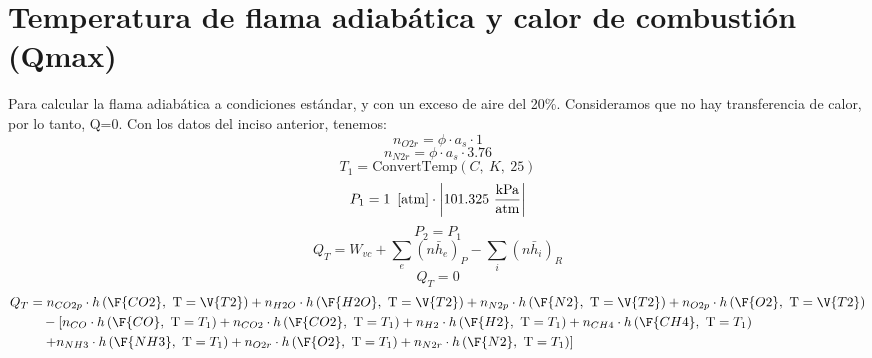 \documentclass{article}
\theoremstyle{mytheoremstyle}
\theoremstyle{mytheoremstyle}
\theoremstyle{myproblemstyle}
\begin{document}
\section{Temperatura de flama adiabática y calor de combustión (Qmax)}
Para calcular la flama adiabática a condiciones estándar, y con un exceso de aire del 20\%. Consideramos que no hay transferencia de calor, por lo tanto, Q=0.
Con los datos del inciso anterior, tenemos:
\begin{equation}
    \label{EES Eqn:28}
    n_{O2r} = \phi\cdot a_{s}\cdot 1 
    \end{equation}
    \begin{equation}
    \label{EES Eqn:29}
    n_{N2r} = \phi\cdot a_{s}\cdot 3.76 
    \end{equation}
    \begin{equation}
    \label{EES Eqn:30}
    T_{1} = \mbox{ConvertTemp}{ \left( C,\ K,\ 25 \right) } 
    \end{equation}
    \begin{equation}
    \label{EES Eqn:31}
    P_{1} = 1   \   \left[ \rm atm \right] \cdot  \rm { \left|101.325\ \frac {\rm{kPa}}{\rm{atm}}\right|} 
    \end{equation}
    {\color{blue} \rm}
    \begin{equation}
    \label{EES Eqn:32}
    P_{2} = P_{1} 
    \end{equation}
    \begin{equation}
    \label{EES Eqn:33}
    Q_{T} = W_{vc} + \sum_{e} (n \bar{h}_e)_P - \sum_{i} (n \bar{h}_i)_R
    \end{equation}
    \begin{equation}
        \label{EES Eqn:33}
        Q_{T} = 0 
        \end{equation}
    \begin{equation}
    \label{EES Eqn:34}
    \begin{align}
        Q_{T} &= n_{CO2p}\cdot h \left(\F{CO2},\mbox{\ T}=\V{T2}  \right)  + n_{H2O}\cdot h \left(\F{H2O},\mbox{\ T}=\V{T2}  \right)  + n_{N2p}\cdot h \left(\F{N2},\mbox{\ T}=\V{T2}  \right)  +  n_{O2p}\cdot h \left(\F{O2},\mbox{\ T}=\V{T2}  \right) \nonumber \\
        &\quad -  \left[ n_{CO}\cdot h \left(\F{CO},\mbox{\ T}=T_{1} \right)  + n_{CO2}\cdot h \left(\F{CO2},\mbox{\ T}=T_{1} \right)  + n_{H2}\cdot h \left(\F{H2},\mbox{\ T}=T_{1} \right)  + n_{CH4}\cdot h \left(\F{CH4},\mbox{\ T}=T_{1} \right) \right. \nonumber \\
        &\quad \left. + n_{NH3}\cdot h \left(\F{NH3},\mbox{\ T}=T_{1} \right)  + n_{O2r}\cdot h \left(\F{O2},\mbox{\ T}=T_{1} \right)  + n_{N2r}\cdot h \left(\F{N2},\mbox{\ T}=T_{1} \right) \right]
    \end{align}
    \end{equation}
\end{document}
